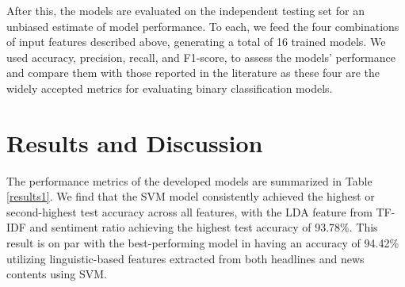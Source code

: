 \documentclass[10pt,a4paper,twoside]{article}
\begin{document}
After this, the models are evaluated on the independent testing set for an unbiased estimate of model performance. To each, we feed the four combinations of input features described above, generating a total of 16 trained models. We used accuracy, precision, recall, and F1-score, to assess the models' performance and compare them with those reported in the literature as these four are the widely accepted metrics for evaluating binary classification models.



\vspace{-0.8em}
\section{Results and Discussion}
The performance metrics of the developed models are summarized in Table \ref{results1}. We find that the SVM model consistently achieved the highest or second-highest test accuracy across all features, with the LDA feature from TF-IDF and sentiment ratio achieving the highest test accuracy of 93.78\%. This result is on par with the best-performing model in \cite{Fernandez} having an accuracy of 94.42\%  utilizing linguistic-based features extracted from both headlines and news contents using SVM.
\vspace{10pt}
\end{document}
